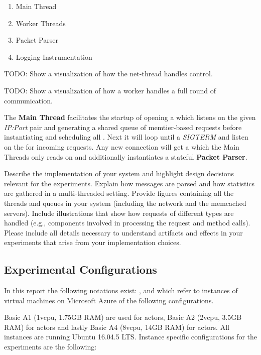     \begin{enumerate}
        \item Main Thread
        \item Worker Threads
        \item Packet Parser
        \item Logging Instrumentation
    \end {enumerate}

    TODO: Show a visualization of how the net-thread handles control.

    TODO: Show a visualization of how a worker handles a full round of communication.

    The \textbf{Main Thread} facilitates the startup of opening a  which listens on the given
    \emph{IP:Port} pair and generating a shared queue of memtier-based requests before instantiating and scheduling all
    . Next it will loop until a \emph{SIGTERM} and listen on the  for incoming
    requests. Any new connection will get a  which the Main Threads only reads on and additionally
    instantiates a stateful \textbf{Packet Parser}.


    Describe the implementation of your system and highlight design decisions relevant for the experiments. Explain how messages are parsed and how statistics are gathered in a multi-threaded setting. Provide figures containing all the threads and queues in your system (including the network and the memcached servers). Include illustrations that show how requests of different types are handled (e.g., components involved in processing the request and method calls). Please include all details necessary to understand artifacts and effects in your experiments that arise from your implementation choices.

    \subsection{Experimental Configurations\label{subsec:1_exp-conf}}
        In this report the following notations exist: \cli, \mw{} and \srv{} which refer
        to instances of virtual machines on Microsoft Azure of the following configurations.

        Basic A1 (1vcpu, 1.75GB RAM) are used for \srv{} actors, Basic A2 (2vcpu, 3.5GB RAM) for \cli{}
        actors and lastly Basic A4 (8vcpu, 14GB RAM) for \mw{} actors. All instances are running Ubuntu
        16.04.5 LTS. Instance specific configurations for the experiments are the following:

